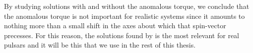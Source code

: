 \documentclass[../full_thesis/full_thesis.tex]{subfiles}
\begin{document}
By studying solutions with and without the anomalous torque, we conclude that
the anomalous torque is not important for realistic systems since it amounts to
nothing more than a small shift in the axes about which that spin-vector
precesses. For this reason, the solutions found by \citet{Goldreich1970} is the
most relevant for real pulsars and it will be this that we use in the rest of
this thesis.



%
%
%
\end{document}

